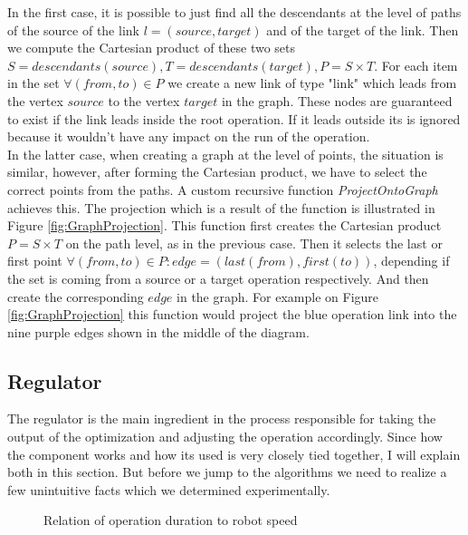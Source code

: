 In the first case, it is possible to just find all the descendants at the level of paths of the source of the link $l = (source, target)$ and of the target of the link.
Then we compute the Cartesian product of these two sets $S = descendants(source), T = descendants(target), P = S \times T$. 
For each item in the set $\forall (from, to) \in P$ we create a new link of type "link" which leads from the vertex $source$ to the vertex $target$ in the graph. 
These nodes are guaranteed to exist if the link leads inside the root operation. 
If it leads outside its is ignored because it wouldn't have any impact on the run of the operation. \\

In the latter case, when creating a graph at the level of points, the situation is similar, however, after forming the Cartesian product, we have to select the correct points from the paths. A custom recursive function \emph{ProjectOntoGraph} achieves this. The projection which is a result of the function is illustrated in Figure \ref{fig:GraphProjection}. This function first creates the Cartesian product $P = S \times T$ on the path level, as in the previous case. Then it selects the last or first point $\forall (from, to) \in P: edge = (last(from), first(to))$, depending if the set is coming from a source or a target operation respectively. And then create the corresponding $edge$ in the graph. For example on Figure \ref{fig:GraphProjection} this function would project the blue operation link into the nine purple edges shown in the middle of the diagram.

\subsection{Regulator}


The regulator is the main ingredient in the process responsible for taking the output of the optimization and adjusting the operation accordingly. Since how the component works and how its used is very closely tied together, I will explain both in this section. But before we jump to the algorithms we need to realize a few unintuitive facts which we determined experimentally. \\

\begin{figure}[ht]
	\caption{Relation of operation duration to robot speed}
	\centering
	
	\label{fig:SpeedVsDuration}
\end{figure}

